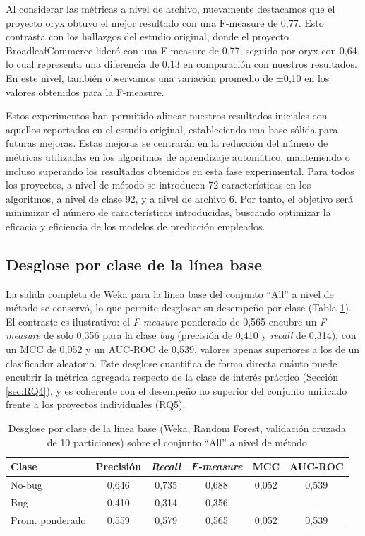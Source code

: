 

Al considerar las métricas a nivel de archivo, nuevamente destacamos que el proyecto oryx obtuvo el mejor resultado con una F-measure de 0,77. Esto contrasta con los hallazgos del estudio original, donde el proyecto BroadleafCommerce lideró con una F-measure de 0,77, seguido por oryx con 0,64, lo cual representa una diferencia de 0,13 en comparación con nuestros resultados. En este nivel, también observamos una variación promedio de ±0,10 en los valores obtenidos para la F-measure.

Estos experimentos han permitido alinear nuestros resultados iniciales con aquellos reportados en el estudio original, estableciendo una base sólida para futuras mejoras. Estas mejoras se centrarán en la reducción del número de métricas utilizadas en los algoritmos de aprendizaje automático, manteniendo o incluso superando los resultados obtenidos en esta fase experimental. Para todos los proyectos, a nivel de método se introducen 72 características en los algoritmos, a nivel de clase 92, y a nivel de archivo 6. Por tanto, el objetivo será minimizar el número de características introducidas, buscando optimizar la eficacia y eficiencia de los modelos de predicción empleados.

\subsection{Desglose por clase de la línea base}

La salida completa de Weka para la línea base del conjunto ``All'' a nivel de método se conservó, lo que permite desglosar su desempeño por clase (Tabla \ref{tab:porclase}). El contraste es ilustrativo: el \textit{F-measure} ponderado de 0,565 encubre un \textit{F-measure} de solo 0,356 para la clase \textit{bug} (precisión de 0,410 y \textit{recall} de 0,314), con un MCC de 0,052 y un AUC-ROC de 0,539, valores apenas superiores a los de un clasificador aleatorio. Este desglose cuantifica de forma directa cuánto puede encubrir la métrica agregada respecto de la clase de interés práctico (Sección \ref{sec:RQ4}), y es coherente con el desempeño no superior del conjunto unificado frente a los proyectos individuales (RQ5).

\begin{table}[H]
\centering
\caption{Desglose por clase de la línea base (Weka, Random Forest, validación cruzada de 10 particiones) sobre el conjunto ``All'' a nivel de método}
\label{tab:porclase}
\begin{tabular}{lccccc}
\toprule
Clase & Precisión & \textit{Recall} & \textit{F-measure} & MCC & AUC-ROC \\
\midrule
No-bug & 0,646 & 0,735 & 0,688 & 0,052 & 0,539 \\
Bug    & 0,410 & 0,314 & 0,356 & ---   & ---   \\
\midrule
Prom. ponderado & 0,559 & 0,579 & 0,565 & 0,052 & 0,539 \\
\bottomrule
\end{tabular}
\end{table}
